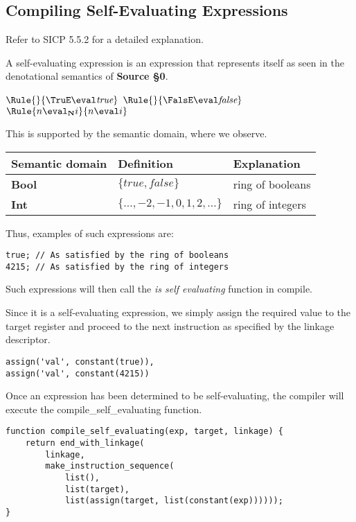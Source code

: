 \subsection{Compiling Self-Evaluating Expressions}
Refer to SICP 5.5.2 for a detailed explanation.

A self-evaluating expression is an expression that represents itself as seen in the denotational semantics of \textbf{Source \S 0}.

\noindent
$\Rule{}{\TruE \eval \textit{true}}$
\hfill
$\Rule{}{\FalsE \eval \textit{false}}$
\hfill
$\Rule{n \eval_{\textbf{N}} i}{n \eval i}$

This is supported by the semantic domain, where we observe.
\begin{center}
\begin{tabular}{|l|ll|} \hline 
Semantic domain & Definition & Explanation\\ \hline
\textbf{Bool} & $\{\textit{true}, \textit{false}\}$ & ring of booleans \\
\textbf{Int}  & $\{\ldots,-2,-1,0,1,2,\ldots\}$     & ring of integers \\ \hline
\end{tabular}
\end{center}

Thus, examples of such expressions are:
\begin{lstlisting}[caption=Examples of self-evaluating expressions]
true; // As satisfied by the ring of booleans
4215; // As satisfied by the ring of integers
\end{lstlisting}

\noindent
Such expressions will then call the \textit{is self evaluating} function in compile.\newline

Since it is a self-evaluating expression, we simply assign the required value to the target register and proceed to the next instruction as specified by the linkage descriptor.
\begin{lstlisting}[caption=RM for self-evaluating expressions]
assign('val', constant(true)),
assign('val', constant(4215))
\end{lstlisting}

Once an expression has been determined to be self-evaluating, the compiler will execute the compile\_self\_evaluating function.

\begin{lstlisting}[caption=Compile self-evaluating]
function compile_self_evaluating(exp, target, linkage) {
    return end_with_linkage(
        linkage,
        make_instruction_sequence(
            list(),
            list(target),
            list(assign(target, list(constant(exp))))));
}
\end{lstlisting}

